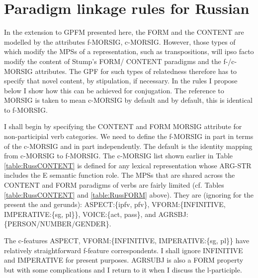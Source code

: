 \documentclass[output=paper,
modfonts
]{LSP/langsci}
\begin{document}
\section{Paradigm linkage rules for Russian} \label{sec:Russparalink}


In the extension to GPFM presented here, the FORM   and the CONTENT  are modelled by the attributes f-MORSIG, c-MORSIG. However, those types of  which modify the MPSs of a representation, such as transpositions, will ipso facto modify the content of Stump's FORM/ CONTENT paradigms and the f-/c-MORSIG attributes. The GPF for such types of relatedness therefore has to specify that novel content, by stipulation, if necessary. In the rules I propose below I show how this can be achieved for  conjugation. The reference to MORSIG is taken to mean c-MORSIG by default and by default, this is identical to f-MORSIG. 

	
I shall begin by specifying the CONTENT and FORM MORSIG attribute for non-participial verb categories.
We need to define the f-MORSIG in part in terms of the c-MORSIG and in part independently. The default is the identity mapping from c-MORSIG to f-MORSIG. The c-MORSIG list shown earlier in Table \ref{table:RussCONTENT} is defined for any lexical representation whose ARG-STR includes the E semantic function role.  The MPSs that are shared across the CONTENT and FORM paradigms of  verbs are fairly limited (cf. Tables \ref{table:RussCONTENT} and \ref{table:RussFORM} above). They are (ignoring for the present the  and gerunds):  ASPECT:\{ipfv, pfv\}, VFORM:\{INFINITIVE, IMPERATIVE:\{sg, pl\}\}, VOICE:\{act, pass\}, and AGRSBJ:\{PERSON/NUMBER/GENDER\}. 


The c-features ASPECT, VFORM:\{INFINITIVE, IMPERATIVE:\{sg, pl\}\} have relatively straightforward f-feature correspondents. I shall ignore INFINITIVE and IMPERATIVE for present purposes. AGRSUBJ is also a FORM property but with some complications and I return to it  when I discuss the l-participle. 
\end{document}
